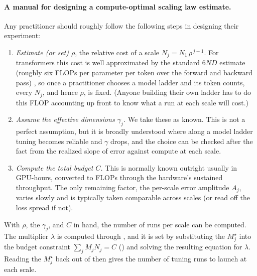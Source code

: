 \paragraph{A manual for designing a compute-optimal scaling law estimate.}

Any practitioner should roughly follow the following steps in designing their experiment:

\begin{enumerate}
    \item  \emph{Estimate (or set) $\rho$}, the relative cost of a scale $N_j = N_1\,\rho^{\,j-1}$. For transformers this cost is well approximated by the standard $6ND$ estimate (roughly six FLOPs per parameter per token over the forward and backward pass) \citep{Kaplan2020ScalingLaws, Hoffmann2022AnEmpirical}, so once a practitioner chooses a model ladder and its token counts, every $N_j$, and hence $\rho$, is fixed. (Anyone building their own ladder has to do this FLOP accounting up front to know what a run at each scale will cost.) 
    \item \emph{Assume the effective dimensions $\gamma_j$.} We take these as known. This is not a perfect assumption, but it is broadly understood where along a model ladder tuning becomes reliable and $\gamma$ drops, and the choice can be checked after the fact from the realized slope of error against compute at each scale. 
    \item \emph{Compute the total budget $C$.} This is normally known outright usually in GPU-hours, converted to FLOPs through the hardware's sustained throughput. The only remaining factor, the per-scale error amplitude $A_j$, varies slowly and is typically taken comparable across scales (or read off the loss spread if not).
\end{enumerate}


With $\rho$, the $\gamma_j$, and $C$ in hand, the number of runs per scale can be computed. The multiplier $\lambda$ is computed through , and it is set by substituting the $M_j^\star$ into the budget constraint $\sum_j M_j N_j = C$ () and solving the resulting equation for $\lambda$. Reading the $M_j^\star$ back out of  then gives the number of tuning runs to launch at each scale.




